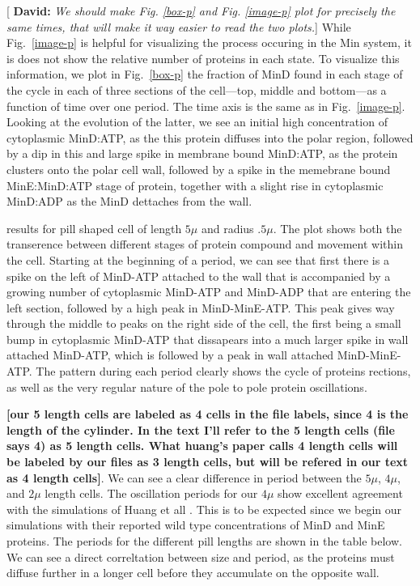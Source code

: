 \documentclass[letterpaper,twocolumn,amsmath,amssymb,pre]{revtex4-1}
\newcommand{\red}[1]{{\bf \color{red} #1}}
\newcommand{\green}[1]{{\bf \color{green} #1}}
\newcommand{\fixme}[1]{\red{[#1]}}
\newcommand{\davidsays}[1]{{\color{red} [\green{David:} \emph{#1}]}}
\begin{document}
\davidsays{We should make Fig. \ref{box-p} and Fig. \ref{image-p} plot
  for precisely the same times, that will make it way easier to read
  the two plots.}  While Fig.~\ref{image-p} is helpful for visualizing
the process occuring in the Min system, it is does not show the
relative number of proteins in each state.  To visualize this
information, we plot in Fig.~\ref{box-p} the fraction of MinD found in
each stage of the cycle in each of three sections of the cell---top,
middle and bottom---as a function of time over one period.  The time
axis is the same as in Fig.~\ref{image-p}.  Looking at the evolution
of the latter, we see an initial high concentration of cytoplasmic
MinD:ATP, as the this protein diffuses into the polar region, followed
by a dip in this and large spike in membrane bound MinD:ATP, as the
protein clusters onto the polar cell wall, followed by a spike in the
memebrane bound MinE:MinD:ATP stage of protein, together with a slight
rise in cytoplasmic MinD:ADP as the MinD dettaches from the wall.

results for pill shaped cell of length
$5\mu$ and radius $.5\mu$.  The plot shows both the transerence
between different stages of protein compound and movement within the
cell.  Starting at the beginning of a period, we can see that first
there is a spike on the left of MinD-ATP attached to the wall that is
accompanied by a growing number of cytoplasmic MinD-ATP and MinD-ADP
that are entering the left section, followed by a high peak in
MinD-MinE-ATP.  This peak gives way through the middle to peaks on the
right side of the cell, the first being a small bump in cytoplasmic
MinD-ATP that dissapears into a much larger spike in wall attached
MinD-ATP, which is followed by a peak in wall attached MinD-MinE-ATP.
The pattern during each period clearly shows the cycle of proteins
rections, as well as the very regular nature of the pole to pole
protein oscillations.

\fixme{our 5 length cells are labeled as 4 cells in the file labels,
  since 4 is the length of the cylinder. In the text I'll refer to the
  5 length cells (file says 4) as 5 length cells.  What huang's paper
  calls 4 length cells will be labeled by our files as 3 length cells,
  but will be refered in our text as 4 length cells}.  We can see a
clear difference in period between the $5\mu$, $4\mu$, and $2\mu$
length cells.  The oscillation periods for our $4\mu$ show excellent
agreement with the simulations of Huang et all
\cite{huang2003dynamic}.  This is to be expected since we begin our
simulations with their reported wild type concentrations of MinD and
MinE proteins. The periods for the different pill lengths are shown in
the table below.  We can see a direct correltation between size and
period, as the proteins must diffuse further in a longer cell before
they accumulate on the opposite wall.
\end{document}
